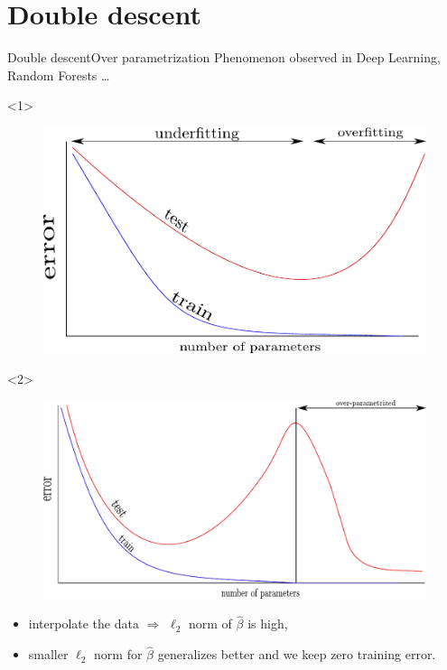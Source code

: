\documentclass[10pt,aspectratio=43]{beamer}
\begin{document}
\section{Double descent}
\begin{frame}{Double descent}{Over parametrization}
    Phenomenon observed in Deep Learning, Random Forests \dots
    \begin{onlyenv}<1>
        \begin{figure}
            \centering
            \includegraphics[scale=.6]{under_overfit_curves.pdf}
        \end{figure}
    \end{onlyenv}
    \begin{onlyenv}<2>
        \begin{figure}
            \centering
            \includegraphics[scale=.6]{scheme_doubledescent.pdf}
        \end{figure}
    \begin{itemize}
        \item interpolate the data $\Longrightarrow$ $\ell_2$ norm of $\hat\beta$ is high,
        \item smaller $\ell_2$ norm for $\hat\beta$ generalizes better and we keep zero training error.
    \end{itemize}
    \end{onlyenv}
\end{frame}
\end{document}
